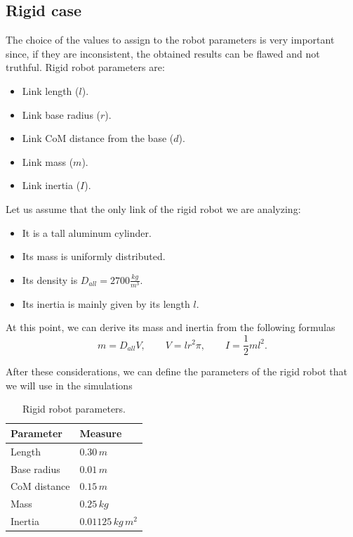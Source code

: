 \documentclass[a4paper]{article}
\begin{document}
\subsection{Rigid case}
\label{sub:rig_sims}
The choice of the values to assign to the robot parameters is very important since, if they are inconsistent, the obtained results can be flawed and not truthful. Rigid robot parameters are:
\begin{itemize}
    \item Link length ($l$).
    \item Link base radius ($r$).
    \item Link CoM distance from the base ($d$).
    \item Link mass ($m$).
    \item Link inertia ($I$).
\end{itemize}

Let us assume that the only link of the rigid robot we are analyzing: 
\begin{itemize}
    \item It is a tall aluminum cylinder.
    \item Its mass is uniformly distributed.
    \item Its density is $D_{all}=2700 \frac{kg}{m^3}$.
    \item Its inertia is mainly given by its length $l$.
\end{itemize} 
At this point, we can derive its mass and inertia from the following formulas
\begin{equation}
    \label{eq:cilinder}
    m=D_{all}V, \qquad  V=lr^2\pi, \qquad    I=\frac{1}{2}ml^2.
\end{equation}

After these considerations, we can define the parameters of the rigid robot that we will use in the simulations

\begin{table}
\centering
\caption{Rigid robot parameters.}
\begin{tabular}{P{2.5cm}P{2.5cm}} 
\hline\hline
 \textbf{Parameter} & \textbf{Measure} \\ 
\hline
 Length & $0.30\, m$\\ 
\hline
 Base radius & $0.01\, m$\\ 
\hline
 CoM distance & $0.15\, m$\\ 
\hline
 Mass & $0.25\, kg$\\
\hline
 Inertia & $0.01125\, kg\,m^2$\\
\hline\hline
\end{tabular}
\end{table}
\end{document}
